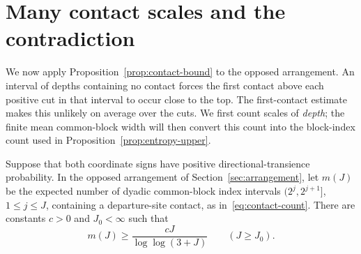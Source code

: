 \section{Many contact scales and the contradiction}
\label{sec:contradiction}

We now apply Proposition~\ref{prop:contact-bound} to the opposed
arrangement.  An interval of depths containing no contact forces the first
contact above each positive cut in that interval to occur close to the
top.  The first-contact estimate makes this unlikely on average over the
cuts.  We first count scales of \emph{depth}; the finite mean common-block
width will then convert this count into the block-index count used in
Proposition~\ref{prop:entropy-upper}.

\begin{proposition}\label{prop:contact-lower}
Suppose that both coordinate signs have positive directional-transience
probability.  In the opposed arrangement of
Section~\ref{sec:arrangement}, let $m(J)$ be the expected number of
dyadic common-block index intervals $(2^j,2^{j+1}]$, $1\le j\le J$,
containing a departure-site contact, as in~\eqref{eq:contact-count}.
There are constants $c>0$ and $J_0<\infty$ such that
\[
 m(J)\ge \frac{cJ}{\log\log(3+J)}\qquad(J\ge J_0).
\]
\end{proposition}


